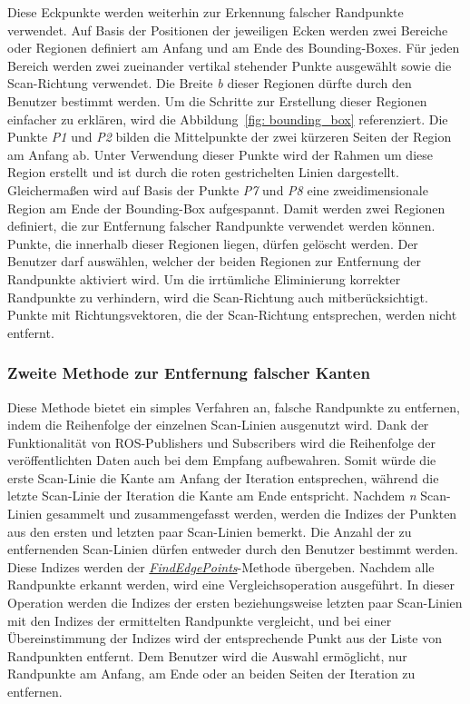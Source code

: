 Diese Eckpunkte werden weiterhin zur Erkennung falscher Randpunkte verwendet. Auf Basis der Positionen der jeweiligen Ecken werden zwei Bereiche oder Regionen definiert \textendash{} am Anfang und am Ende des Bounding-Boxes. Für jeden Bereich werden zwei zueinander vertikal stehender Punkte ausgewählt sowie die Scan-Richtung verwendet. Die Breite \textit{b} dieser Regionen dürfte durch den Benutzer bestimmt werden. Um die Schritte zur Erstellung dieser Regionen einfacher zu erklären, wird die Abbildung~\ref{fig: bounding_box} referenziert. Die Punkte \textit{P1} und \textit{P2} bilden die Mittelpunkte der zwei kürzeren Seiten der Region am Anfang ab. Unter Verwendung dieser Punkte wird der Rahmen um diese Region erstellt und ist durch die roten gestrichelten Linien dargestellt. Gleichermaßen wird auf Basis der Punkte \textit{P7} und \textit{P8} eine zweidimensionale Region am Ende der Bounding-Box aufgespannt. Damit werden zwei Regionen definiert, die zur Entfernung falscher Randpunkte verwendet werden können. Punkte, die innerhalb dieser Regionen liegen, dürfen gelöscht werden. Der Benutzer darf auswählen, welcher der beiden Regionen zur Entfernung der Randpunkte aktiviert wird. Um die irrtümliche Eliminierung korrekter Randpunkte zu verhindern, wird die Scan-Richtung auch mitberücksichtigt. Punkte mit Richtungsvektoren, die der Scan-Richtung entsprechen, werden nicht entfernt. 


\subsubsection{Zweite Methode zur Entfernung falscher Kanten}
Diese Methode bietet ein simples Verfahren an, falsche Randpunkte zu entfernen, indem die Reihenfolge der einzelnen Scan-Linien ausgenutzt wird. Dank der Funktionalität von ROS-Publishers und Subscribers wird die Reihenfolge der veröffentlichten Daten auch bei dem Empfang aufbewahren. Somit würde die erste Scan-Linie die Kante am Anfang der Iteration entsprechen, während die letzte Scan-Linie der Iteration die Kante am Ende entspricht. Nachdem \textit{n} Scan-Linien gesammelt und zusammengefasst werden, werden die Indizes der Punkten aus den ersten und letzten paar Scan-Linien bemerkt. Die Anzahl der zu entfernenden Scan-Linien dürfen entweder durch den Benutzer bestimmt werden. Diese Indizes werden der \textit{\hyperref[alg:find_edge_points]{FindEdgePoints}}-Methode übergeben. Nachdem alle Randpunkte erkannt werden, wird eine Vergleichsoperation ausgeführt. In dieser Operation werden die Indizes der ersten beziehungsweise letzten paar Scan-Linien mit den Indizes der ermittelten Randpunkte vergleicht, und bei einer Übereinstimmung der Indizes wird der entsprechende Punkt aus der Liste von Randpunkten entfernt. Dem Benutzer wird die Auswahl ermöglicht, nur Randpunkte am Anfang, am Ende oder an beiden Seiten der Iteration zu entfernen.


